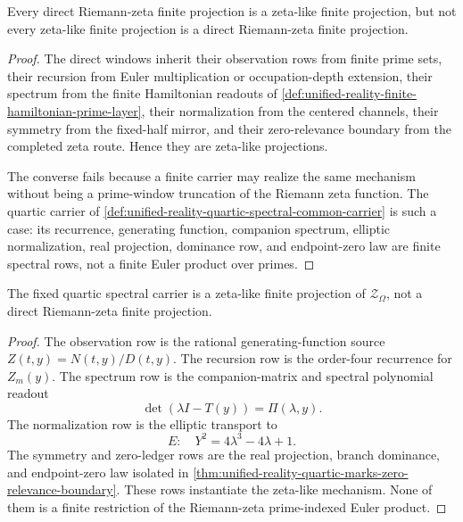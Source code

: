 \begin{theorem}
\label{thm:unified-reality-direct-windows-zeta-like-projections}
Every direct Riemann-zeta finite projection is a zeta-like finite
projection, but not every zeta-like finite projection is a direct
Riemann-zeta finite projection.
\end{theorem}

\begin{proof}
The direct windows inherit their observation rows from finite prime
sets, their recursion from Euler multiplication or occupation-depth
extension, their spectrum from the finite Hamiltonian readouts of
\autoref{def:unified-reality-finite-hamiltonian-prime-layer}, their
normalization from the centered channels, their symmetry from the
fixed-half mirror, and their zero-relevance boundary from the completed
zeta route.  Hence they are zeta-like projections.

The converse fails because a finite carrier may realize the same
mechanism without being a prime-window truncation of the Riemann zeta
function.  The quartic carrier of
\autoref{def:unified-reality-quartic-spectral-common-carrier} is such a
case: its recurrence, generating function, companion spectrum, elliptic
normalization, real projection, dominance row, and endpoint-zero law are
finite spectral rows, not a finite Euler product over primes.
\end{proof}

\begin{theorem}
\label{thm:unified-reality-quartic-zeta-like-finite-projection}
The fixed quartic spectral carrier is a zeta-like finite projection of
$\mathcal Z_{\Omega}$, not a direct Riemann-zeta finite projection.
\end{theorem}

\begin{proof}
The observation row is the rational generating-function source
$Z(t,y)=N(t,y)/D(t,y)$.  The recursion row is the order-four recurrence
for $Z_m(y)$.  The spectrum row is the companion-matrix and spectral
polynomial readout
$$
\det(\lambda I-T(y))=\Pi(\lambda,y).
$$
The normalization row is the elliptic transport to
$$
E:\quad Y^2=4\lambda^3-4\lambda+1.
$$
The symmetry and zero-ledger rows are the real projection, branch
dominance, and endpoint-zero law isolated in
\autoref{thm:unified-reality-quartic-marks-zero-relevance-boundary}.
These rows instantiate the zeta-like mechanism.  None of them is a
finite restriction of the Riemann-zeta prime-indexed Euler product.
\end{proof}

